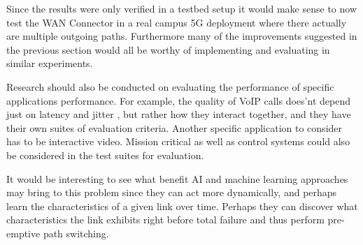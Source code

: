 Since the results were only verified in a testbed setup it would make sense to now test the WAN Connector in a real campus 5G deployment where there actually are multiple outgoing paths. Furthermore many of the improvements suggested in the previous section would all be worthy of implementing and evaluating in similar experiments.

Research should also be conducted on evaluating the performance of specific applications performance. For example, the quality of VoIP calls does'nt depend just on latency and jitter \cite{voip-measurement}, but rather how they interact together, and they have their own suites of evaluation criteria. Another specific application to consider has to be interactive video. Mission critical as well as control systems could also be considered in the test suites for evaluation.

It would be interesting to see what benefit AI and machine learning approaches may bring to this problem since they can act more dynamically, and perhaps learn the characteristics of a given link over time. Perhaps they can discover what characteristics the link exhibits right before total failure and thus perform pre-emptive path switching.